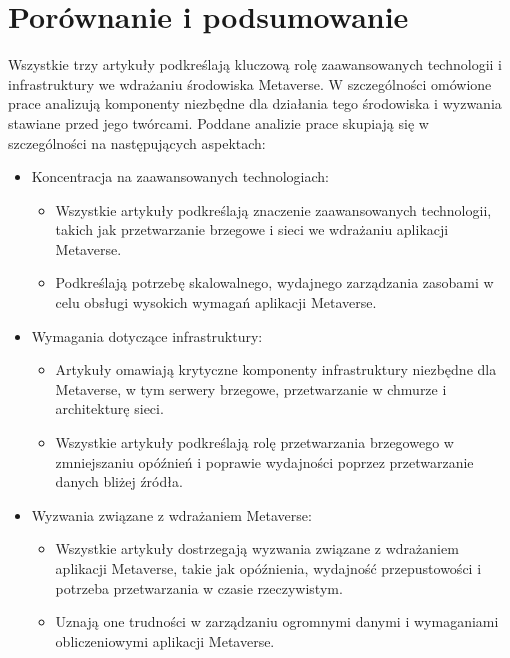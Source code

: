\section{Porównanie i podsumowanie}

Wszystkie trzy artykuły podkreślają kluczową rolę zaawansowanych technologii i infrastruktury we wdrażaniu środowiska Metaverse. W szczególności omówione prace analizują komponenty niezbędne dla działania tego środowiska i wyzwania stawiane przed jego twórcami. Poddane analizie prace skupiają się w szczególności na następujących aspektach: 
\begin{itemize}
    \item Koncentracja na zaawansowanych technologiach:
    \begin{itemize}
        \item Wszystkie artykuły podkreślają znaczenie zaawansowanych technologii, takich jak przetwarzanie brzegowe i sieci  we wdrażaniu aplikacji Metaverse.
        \item Podkreślają potrzebę skalowalnego, wydajnego zarządzania zasobami w celu obsługi wysokich wymagań aplikacji Metaverse.
    \end{itemize}
    \item Wymagania dotyczące infrastruktury:
    \begin{itemize}
        \item Artykuły omawiają krytyczne komponenty infrastruktury niezbędne dla Metaverse, w tym serwery brzegowe, przetwarzanie w chmurze i architekturę sieci.
        \item Wszystkie artykuły podkreślają rolę przetwarzania brzegowego w zmniejszaniu opóźnień i poprawie wydajności poprzez przetwarzanie danych bliżej źródła.
    \end{itemize}
    \item Wyzwania związane z wdrażaniem Metaverse:
    \begin{itemize}
        \item Wszystkie artykuły dostrzegają wyzwania związane z wdrażaniem aplikacji Metaverse, takie jak opóźnienia, wydajność przepustowości i potrzeba przetwarzania w czasie rzeczywistym.
        \item Uznają one trudności w zarządzaniu ogromnymi danymi i wymaganiami obliczeniowymi aplikacji Metaverse.
    \end{itemize}
\end{itemize}

